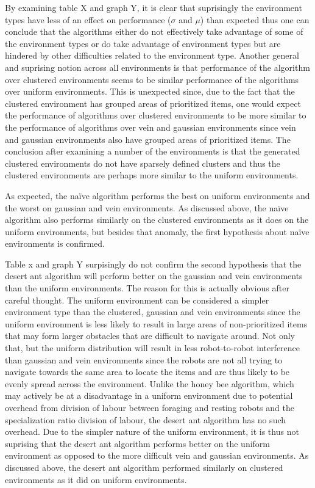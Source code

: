 By examining table X and graph Y, it is clear that suprisingly the environment types have less of an effect on performance ($\sigma$ and $\mu$) than expected thus one can conclude that the algorithms either do not effectively take advantage of some of the environment types or do take advantage of environment types but are hindered by other difficulties related to the environment type. Another general and suprising notion across all environments is that performance of the algorithm over clustered environments seems to be similar performance of the algorithms over uniform environments. This is unexpected since, due to the fact that the clustered environment has grouped areas of prioritized items, one would expect the performance of algorithms over clustered environments to be more similar to the performance of algorithms over vein and gaussian environments since vein and gaussian environments also have grouped areas of prioritized items. The conclusion after examining a number of the environments is that the generated clustered environments do not have sparsely defined clusters and thus the clustered environments are perhaps more similar to the uniform environments. 

As expected, the na\"ive algorithm performs the best on uniform environments and the worst on gaussian and vein environments. As discussed above, the na\"ive algorithm also performs similarly on the clustered environments as it does on the uniform environments, but besides that anomaly, the first hypothesis about na\"ive environments is confirmed. 

Table x and graph Y surpisingly do not confirm the second hypothesis that the desert ant algorithm will perform better on the gaussian and vein environments than the uniform environments. The reason for this is actually obvious after careful thought. The uniform environment can be considered a simpler environment type than the  clustered, gaussian and vein environments since the uniform environment is less likely to result in large areas of non-prioritized items that may form larger obstacles that are difficult to navigate around. Not only that, but the uniform distribution will result in less robot-to-robot interference than gaussian and vein environments since the robots are not all trying to navigate towards the same area to locate the items and are thus likely to be evenly spread across the environment. Unlike the honey bee algorithm, which may actively be at a disadvantage in a uniform environment due to potential overhead from division of labour between foraging and resting robots and the specialization ratio division of labour, the desert ant algorithm has no such overhead. Due to the simpler nature of the uniform environment, it is thus not suprising that the desert ant algorithm performs better on the uniform environment as opposed to the more difficult vein and gaussian environments. As discussed above, the desert ant algorithm performed similarly on clustered environments as it did on uniform environments. 

